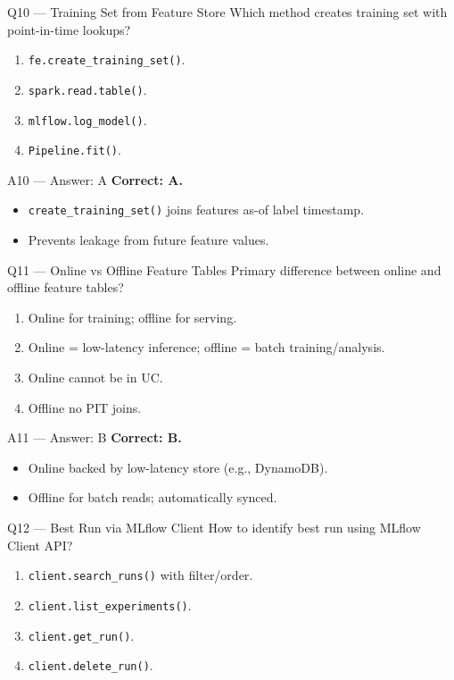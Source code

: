\documentclass[aspectratio=169,9pt]{beamer}
\begin{document}
	\begin{frame}{Q10 — Training Set from Feature Store}
		Which method creates training set with point-in-time lookups?
		\begin{enumerate}[label=\Alph*.]
			\item \texttt{fe.create\_training\_set()}.
			\item \texttt{spark.read.table()}.
			\item \texttt{mlflow.log\_model()}.
			\item \texttt{Pipeline.fit()}.
		\end{enumerate}
	\end{frame}
	
	\begin{frame}{A10 — Answer: A}
		\textbf{Correct: A.}
		\begin{itemize}
			\item \texttt{create\_training\_set()} joins features as-of label timestamp.
			\item Prevents leakage from future feature values.
		\end{itemize}
	\end{frame}
	
	\begin{frame}{Q11 — Online vs Offline Feature Tables}
		Primary difference between online and offline feature tables?
		\begin{enumerate}[label=\Alph*.]
			\item Online for training; offline for serving.
			\item Online = low-latency inference; offline = batch training/analysis.
			\item Online cannot be in UC.
			\item Offline no PIT joins.
		\end{enumerate}
	\end{frame}
	
	\begin{frame}{A11 — Answer: B}
		\textbf{Correct: B.}
		\begin{itemize}
			\item Online backed by low-latency store (e.g., DynamoDB).
			\item Offline for batch reads; automatically synced.
		\end{itemize}
	\end{frame}
	
	\begin{frame}{Q12 — Best Run via MLflow Client}
		How to identify best run using MLflow Client API?
		\begin{enumerate}[label=\Alph*.]
			\item \texttt{client.search\_runs()} with filter/order.
			\item \texttt{client.list\_experiments()}.
			\item \texttt{client.get\_run()}.
			\item \texttt{client.delete\_run()}.
		\end{enumerate}
	\end{frame}
	
\end{document}
